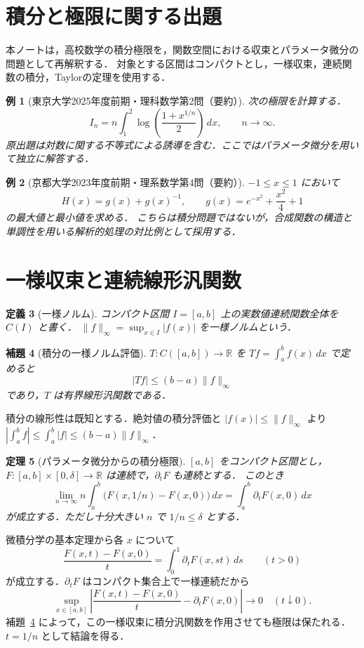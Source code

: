\documentclass[a5paper,10pt,onecolumn]{jsarticle}
\makeatletter
\theoremstyle{mathnotetheorem}
\newtheorem{theorem}{定理}[section]
\newtheorem{definition}[theorem]{定義}
\newtheorem{lemma}[theorem]{補題}
\newtheorem{example}[theorem]{例}
\renewcommand{\proofname}{証明}
\renewenvironment{proof}[1][\proofname]{%
  \par\pushQED{\qed}\normalfont\topsep4\p@\@plus2\p@\relax
  \trivlist\item[\hskip\labelsep\bfseries #1]\ignorespaces
}{\popQED\endtrivlist\@endpefalse}
\newcommand{\norm}[1]{\lVert #1\rVert}
\makeatother
\begin{document}
\section{積分と極限に関する出題}
本ノートは，高校数学の積分極限を，関数空間における収束とパラメータ微分の問題として再解釈する．
対象とする区間はコンパクトとし，一様収束，連続関数の積分，Taylorの定理を使用する．

\begin{example}[東京大学2025年度前期・理科数学第2問（要約）]\label{ex:tokyo}
次の極限を計算する．
\begin{equation}\label{eq:tokyo}
 I_n=n\int_1^2\log\left(\frac{1+x^{1/n}}2\right)\,dx,
 \qquad n\longrightarrow\infty.
\end{equation}
原出題は対数に関する不等式による誘導を含む．ここではパラメータ微分を用いて独立に解答する．
\end{example}

\begin{example}[京都大学2023年度前期・理系数学第4問（要約）]\label{ex:kyoto}
$-1\le x\le1$ において
\[
 H(x)=g(x)+g(x)^{-1},\qquad
 g(x)=e^{-x^2}+\frac{x^2}{4}+1
\]
の最大値と最小値を求める．
こちらは積分問題ではないが，合成関数の構造と単調性を用いる解析的処理の対比例として採用する．
\end{example}

\section{一様収束と連続線形汎関数}
\begin{definition}[一様ノルム]
コンパクト区間 $I=[a,b]$ 上の実数値連続関数全体を $C(I)$ と書く．
$\norm f_\infty=\sup_{x\in I}|f(x)|$ を一様ノルムという．
\end{definition}
\begin{lemma}[積分の一様ノルム評価]\label{lem:integral}
$T:C([a,b])\to\mathbb R$ を $Tf=\int_a^b f(x)\,dx$ で定めると
\[
 |Tf|\le(b-a)\norm f_\infty
\]
であり，$T$ は有界線形汎関数である．
\end{lemma}
\begin{proof}
積分の線形性は既知とする．絶対値の積分評価と $|f(x)|\le\norm f_\infty$ より
$|\int_a^b f|\le\int_a^b|f|\le(b-a)\norm f_\infty$．
\end{proof}

\begin{theorem}[パラメータ微分からの積分極限]\label{thm:parameter}
$[a,b]$ をコンパクト区間とし，$F:[a,b]\times[0,\delta]\to\mathbb R$ は連続で，$\partial_tF$ も連続とする．
このとき
\[
 \lim_{n\to\infty}n\int_a^b
  \bigl(F(x,1/n)-F(x,0)\bigr)\,dx
 =\int_a^b\partial_tF(x,0)\,dx
\]
が成立する．ただし十分大きい $n$ で $1/n\le\delta$ とする．
\end{theorem}
\begin{proof}
微積分学の基本定理から各 $x$ について
\[
 \frac{F(x,t)-F(x,0)}t
 =\int_0^1\partial_tF(x,st)\,ds \qquad(t>0)
\]
が成立する．$\partial_tF$ はコンパクト集合上で一様連続だから
\[
 \sup_{x\in[a,b]}\left|
 \frac{F(x,t)-F(x,0)}t-\partial_tF(x,0)
 \right|\longrightarrow0\quad(t\downarrow0).
\]
補題~\ref{lem:integral} によって，この一様収束に積分汎関数を作用させても極限は保たれる．$t=1/n$ として結論を得る．
\end{proof}
\end{document}
